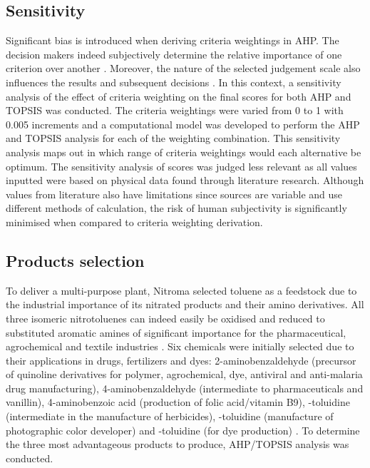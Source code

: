 \subsection{Sensitivity} %

Significant bias is introduced when deriving criteria weightings in AHP. The decision makers indeed subjectively determine the relative importance of one criterion over another \cite{triantaphyllou_sensitivity_1997}. Moreover, the nature of the selected judgement scale also influences the results and subsequent decisions \cite{franek_judgment_2014}. In this context, a sensitivity analysis of the effect of criteria weighting on the final scores for both AHP and TOPSIS was conducted. The criteria weightings were varied from 0 to 1 with 0.005 increments and a computational model was developed to perform the AHP and TOPSIS analysis for each of the weighting combination. This sensitivity analysis maps out in which range of criteria weightings would each alternative be optimum. The sensitivity analysis of scores was judged less relevant as all values inputted were based on physical data found through literature research. Although values from literature also have limitations since sources are variable and use different methods of calculation, the risk of human subjectivity is significantly minimised when compared to criteria weighting derivation.


\subsection{Products selection}
\label{sec:product-selection}

To deliver a multi-purpose plant, Nitroma selected toluene as a feedstock due to the industrial importance of its nitrated products and their amino derivatives. All three isomeric nitrotoluenes can indeed easily be oxidised and reduced to substituted aromatic amines of significant importance for the pharmaceutical, agrochemical and textile industries \cite{dugal_nitrobenzene_2005}. Six chemicals were initially selected due to their applications in drugs, fertilizers and dyes: 2-aminobenzaldehyde (precursor of quinoline derivatives for polymer, agrochemical, dye, antiviral and anti-malaria drug manufacturing), 4-aminobenzaldehyde (intermediate to pharmaceuticals and vanillin), 4-aminobenzoic acid (production of folic acid/vitamin B9), \ortho-toluidine (intermediate in the manufacture of herbicides), \meta-toluidine (manufacture of  photographic color developer) and \para-toluidine (for dye production) \cite{bowers_toluidines_2000,bruhne_benzaldehyde_2011,maki_benzoic_2000}. To determine the three most advantageous products to produce, AHP/TOPSIS analysis was conducted.

